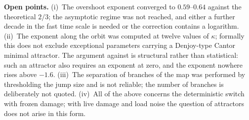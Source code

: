 \documentclass[11pt,a4paper]{article}
\begin{document}
\smallskip\noindent\textbf{Open points.} (i)~The overshoot exponent converged to $0.59$--$0.64$
against the theoretical $2/3$; the asymptotic regime was not reached, and either a further decade in
the fast time scale is needed or the correction contains a logarithm. (ii)~The exponent along the
orbit was computed at twelve values of $\kappa$; formally this does not exclude exceptional
parameters carrying a Denjoy-type Cantor minimal attractor. The argument against is structural
rather than statistical: such an attractor also requires an exponent at zero, and the exponent
nowhere rises above $-1.6$. (iii)~The separation of branches of the map was performed by thresholding
the jump size and is not reliable; the number of branches is deliberately not quoted. (iv)~All of the
above concerns the deterministic switch with frozen damage; with live damage and load noise the
question of attractors does not arise in this form.
\end{document}
